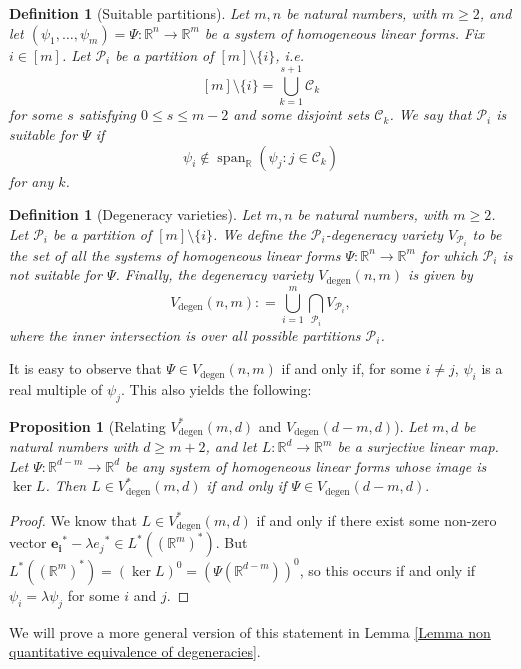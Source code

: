 \documentclass[12pt,a4paper,twoside,reqno]{amsart}
\newtheorem{Proposition}[Theorem]{Proposition}
\newtheorem{Definition}[Theorem]{Definition}
\newcommand{\degen}{\operatorname{degen}}
\numberwithin{equation}{section}
\begin{document}
\begin{Definition}[Suitable partitions]
\label{Definition suitable partitions}
Let $m,n$ be natural numbers, with $m\geqslant 2$, and let $(\psi_1,\dots,\psi_m) = \Psi:\mathbb{R}^n \longrightarrow \mathbb{R}^m$ be a system of homogeneous linear forms. Fix $i\in [m]$. Let $\mathcal{P}_i$ be a partition of $[m]\setminus \{i\}$, i.e. $$[m]\setminus \{i\} = \bigcup\limits_{k=1}^{s+1} \mathcal{C}_k$$ for some $s$ satisfying $0\leqslant s \leqslant m-2$ and some disjoint sets $\mathcal{C}_k$. We say that $\mathcal{P}_i$ is \emph{suitable} for $\Psi$ if $$\psi_i \notin \operatorname{span}_\mathbb{R}(\psi_j: j\in \mathcal{C}_k)$$ for any $k$. 
\end{Definition}

\begin{Definition}[Degeneracy varieties]
\label{Definition degeneracy varieties}
Let $m,n$ be natural numbers, with $m\geqslant 2$. Let $\mathcal{P}_i$ be a partition of $[m]\setminus \{i\}$. We define the \emph{$\mathcal{P}_i$-degeneracy variety} $V_{\mathcal{P}_i}$ to be the set of all the systems of homogeneous linear forms $\Psi:\mathbb{R}^n\rightarrow \mathbb{R}^m$ for which $\mathcal{P}_i$ is not suitable for $\Psi$. Finally, the \emph{degeneracy variety} $V_{\degen}(n,m)$ is given by \[ V_{\degen}(n,m): = \bigcup\limits_{i = 1}^m \bigcap\limits_{\mathcal{P}_i} V_{\mathcal{P}_i},\] where the inner intersection is over all possible partitions $\mathcal{P}_i$.
\end{Definition}

It is easy to observe that $\Psi \in V_{\degen}(n,m)$ if and only if, for some $i\neq j$, $\psi_i$ is a real multiple of $\psi_j$. This also yields the following:

\begin{Proposition}[Relating $V_{\degen}^*(m,d)$ and $V_{\degen}(d-m,d)$]
\label{Proposition easy degeneracy relation}
Let $m,d$ be natural numbers with $d \geqslant m+2$, and let $L:\mathbb{R}^d \longrightarrow \mathbb{R}^m$ be a surjective linear map. Let $\Psi: \mathbb{R}^{d-m} \longrightarrow \mathbb{R}^d$ be any system of homogeneous linear forms whose image is $\ker L$. Then $L \in V_{\degen}^*(m,d)$ if and only if $\Psi \in V_{\degen}(d-m,d).$
\end{Proposition}
\begin{proof}
We know that $L \in V_{\degen}^*(m,d)$ if and only if there exist some non-zero vector $\mathbf{e_i}^* - \lambda{e_j}^* \in L^*((\mathbb{R}^m)^*)$. But $ L^*((\mathbb{R}^m)^*) = (\ker L)^0 = (\Psi(\mathbb{R}^{d-m}))^0$, so this occurs if and only if $\psi_i = \lambda \psi_j$ for some $i$ and $j$. 
\end{proof}
\noindent We will prove a more general version of this statement in Lemma \ref{Lemma non quantitative equivalence of degeneracies}.\\
\end{document}
